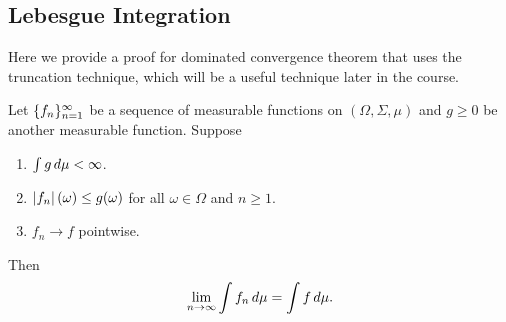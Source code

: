 \documentclass[a4paper]{article}
\begin{document}
\subsection{Lebesgue Integration}

Here we provide a proof for dominated convergence theorem that uses
the truncation technique, which will be a useful technique later
in the course.

\begin{thm}
  Let $\{ f_n \}_{n=1}^\infty$ be a sequence of measurable
  functions on $(\Omega, \Sigma, \mu)$ and $g \geq 0$ be another measurable
  function. Suppose
  \begin{enumerate}
    \item $\int g \, d \mu < \infty$.
    \item $\left\lvert f_n\right\rvert (\omega) \leq g (\omega)$ for all $\omega \in \Omega$
          and $n \geq 1$.
    \item $f_n \to f$ pointwise.
  \end{enumerate}
  Then
  \[
    \lim_{n \to \infty} \int f_n \, d \mu = \int f \, d \mu.
  \]
\end{thm}
\end{document}
